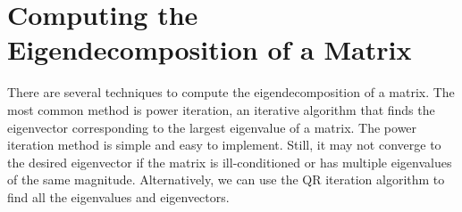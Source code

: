 \documentclass{article}[11pt]
\begin{document}


\section{Computing the Eigendecomposition of a Matrix}
There are several techniques to compute the eigendecomposition of a matrix. 
The most common method is power iteration, an iterative algorithm that finds the eigenvector corresponding to the largest eigenvalue of a matrix.
The power iteration method is simple and easy to implement. Still, it may not converge to the desired eigenvector if the matrix is ill-conditioned or has multiple eigenvalues of the same magnitude.
Alternatively, we can use the QR iteration algorithm to find all the eigenvalues and eigenvectors.
\end{document}
